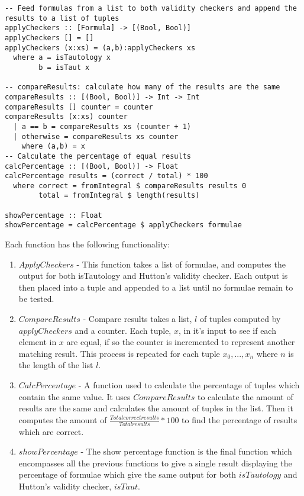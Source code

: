 \documentclass{article}%
\begin{document}
\begin{verbatim}
-- Feed formulas from a list to both validity checkers and append the results to a list of tuples
applyCheckers :: [Formula] -> [(Bool, Bool)]
applyCheckers [] = []
applyCheckers (x:xs) = (a,b):applyCheckers xs
  where a = isTautology x 
        b = isTaut x

-- compareResults: calculate how many of the results are the same
compareResults :: [(Bool, Bool)] -> Int -> Int
compareResults [] counter = counter
compareResults (x:xs) counter 
  | a == b = compareResults xs (counter + 1)
  | otherwise = compareResults xs counter
    where (a,b) = x
-- Calculate the percentage of equal results
calcPercentage :: [(Bool, Bool)] -> Float 
calcPercentage results = (correct / total) * 100
  where correct = fromIntegral $ compareResults results 0
        total = fromIntegral $ length(results)

showPercentage :: Float 
showPercentage = calcPercentage $ applyCheckers formulae
\end{verbatim}
Each function has the following functionality:
\begin{enumerate}
\item $ApplyCheckers$ - This function takes a list of formulae,  and computes the output for both isTautology and Hutton's validity checker. Each output is then placed into a tuple and appended to a list until no formulae remain to be tested. 
\item $CompareResults$ - Compare results takes a list, $l$ of tuples computed by $applyCheckers$ and a counter. Each tuple, $x$, in it's input to see if each element in $x$ are equal, if so the counter is incremented to represent another matching result. This process is repeated for each tuple $x_0,...,x_n$ where $n$ is the length of the list $l$. 
\item $CalcPercentage$ - A function used to calculate the percentage of tuples which contain the same value. It uses $CompareResults$ to calculate the amount of results are the same and calculates the amount of tuples in the list. Then it computes the amount of $\frac{Total correct results}{Total results} * 100$ to find the percentage of results which are correct. 
\item $showPercentage$ - The show percentage function is the final function which encompasses all the previous functions to give a single result displaying the percentage of formulae which give the same output for both $isTautology$ and Hutton's validity checker, $isTaut$.
\end{enumerate}
\end{document}
